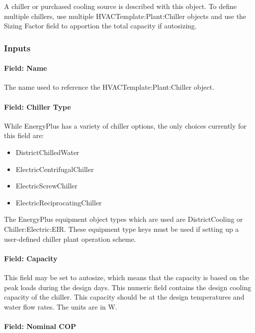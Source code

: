A chiller or purchased cooling source is described with this object. To define multiple chillers, use multiple HVACTemplate:Plant:Chiller objects and use the Sizing Factor field to apportion the total capacity if autosizing.

\subsubsection{Inputs}\label{inputs-24-000}

\paragraph{Field: Name}\label{field-name-11-005}

The name used to reference the HVACTemplate:Plant:Chiller object.

\paragraph{Field: Chiller Type}\label{field-chiller-type}

While EnergyPlus has a variety of chiller options, the only choices currently for this field are:

\begin{itemize}
\item
  DistrictChilledWater
\item
  ElectricCentrifugalChiller
\item
  ElectricScrewChiller
\item
  ElectricReciprocatingChiller
\end{itemize}

The EnergyPlus equipment object types which are used are DistrictCooling or Chiller:Electric:EIR. These equipment type keys must be used if setting up a user-defined chiller plant operation scheme.

\paragraph{Field: Capacity}\label{field-capacity}

This field may be set to autosize, which means that the capacity is based on the peak loads during the design days. This numeric field contains the design cooling capacity of the chiller. This capacity should be at the design temperatures and water flow rates. The units are in W.

\paragraph{Field: Nominal COP}\label{field-nominal-cop}

